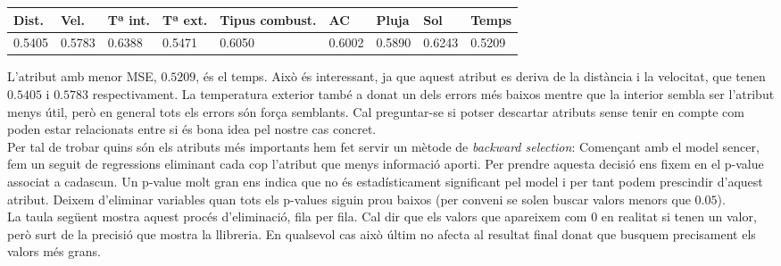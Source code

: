 \documentclass[a4paper, 11pt]{article}
\begin{document}
    \begin{table}[H]
        \centering
        \begin{tabular}{lllllllll}
            \hline
            \multicolumn{1}{|l|}{\textbf{Dist.}} & \multicolumn{1}{l|}{\textbf{Vel.}} & \multicolumn{1}{l|}{\textbf{Tª int.}} & \multicolumn{1}{l|}{\textbf{Tª ext.}} & \multicolumn{1}{l|}{\textbf{Tipus combust.}} & \multicolumn{1}{l|}{\textbf{AC}} & \multicolumn{1}{l|}{\textbf{Pluja}} & \multicolumn{1}{l|}{\textbf{Sol}} & \multicolumn{1}{l|}{\textbf{Temps}} \\ \hline
            0.5405                                   & 0.5783                                  & 0.6388                                & 0.5471                                & 0.6050                                   & 0.6002                           & 0.5890                              & 0.6243                            & 0.5209
        \end{tabular}
    \end{table}


    L'atribut amb menor MSE, $0.5209$, és el temps. Això és interessant, ja que aquest atribut
    es deriva de la distància i la velocitat, que tenen $0.5405$ i $0.5783$ respectivament. La
    temperatura exterior també a donat un dels errors més baixos mentre que la interior sembla
    ser l’atribut menys útil, però en general tots els errors són força semblants. Cal
    preguntar-se si potser descartar atributs sense tenir en compte com poden estar relacionats
    entre si és bona idea pel nostre cas concret.\\


    Per tal de trobar quins són els atributs més importants hem fet servir un mètode de \textit
    {backward selection}: Començant amb el model sencer, fem un seguit de regressions eliminant
    cada cop l'atribut que menys informació aporti. Per prendre aquesta decisió ens fixem en el
    p-value associat a cadascun. Un p-value molt gran ens indica que no és estadísticament
    significant pel model i per tant podem prescindir d'aquest atribut. Deixem d’eliminar
    variables quan tots els p-values siguin prou baixos (per conveni se solen buscar valors
    menors que $0.05$).\\

    La taula següent mostra aquest procés d'eliminació, fila per fila. Cal dir que els valors
    que apareixem com 0 en realitat si tenen un valor, però surt de la precisió que mostra la
    llibreria. En qualsevol cas això últim no afecta al resultat final donat que busquem
    precisament els valors més grans.\\
\end{document}
